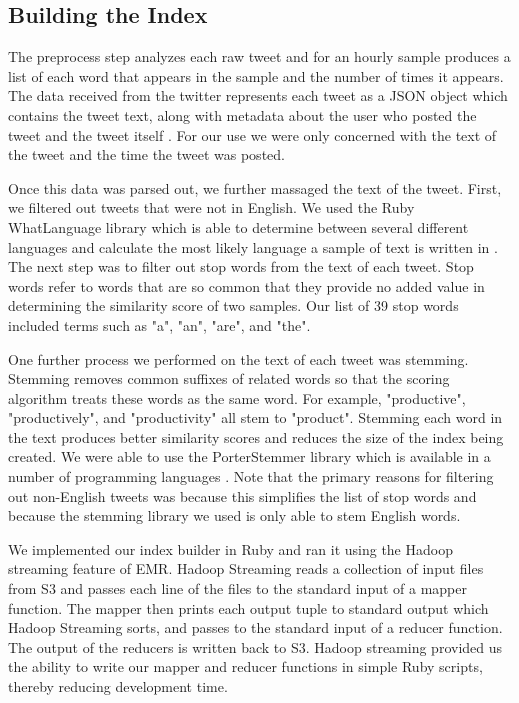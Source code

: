 \documentclass[twocolumn]{article}
\begin{document}
\subsection{Building the Index}
The preprocess step analyzes each raw tweet and for an hourly sample produces a list of each word that appears in the sample and the number of times it appears. The data received from the twitter represents each tweet as a JSON object which contains the tweet text, along with metadata about the user who posted the tweet and the tweet itself \cite{twitterget}. For our use we were only concerned with the text of the tweet and the time the tweet was posted. 

Once this data was parsed out, we further massaged the text of the tweet. First, we filtered out tweets that were not in English. We used the Ruby WhatLanguage library which is able to determine between several different languages and calculate the most likely language a sample of text is written in \cite{whatlanguage}. The next step was to filter out stop words from the text of each tweet. Stop words refer to words that are so common that they provide no added value in determining the similarity score of two samples. Our list of 39 stop words included terms such as "a", "an", "are", and "the". 

One further process we performed on the text of each tweet was stemming. Stemming removes common suffixes of related words so that the scoring algorithm treats these words as the same word. For example, "productive", "productively", and "productivity" all stem to "product". Stemming each word in the text produces better similarity scores and reduces the size of the index being created. We were able to use the PorterStemmer library which is available in a number of programming languages \cite{porterstem}. Note that the primary reasons for filtering out non-English tweets was because this simplifies the list of stop words and because the stemming library we used is only able to stem English words.

We implemented our index builder in Ruby and ran it using the Hadoop streaming feature of EMR. Hadoop Streaming reads a collection of input files from S3 and passes each line of the files to the standard input of a mapper function. The mapper then prints each output tuple to standard output which Hadoop Streaming sorts, and passes to the standard input of a reducer function. The output of the reducers is written back to S3. Hadoop streaming provided us the ability to write our mapper and reducer functions in simple Ruby scripts, thereby reducing development time.
\end{document}
